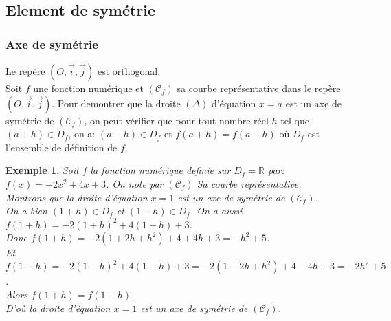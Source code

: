 \documentclass[a4paper, 12pt]{report}
\newtheorem{exemple}{Exemple}[section]
\begin{document}
            \subsection{Element de symétrie}
                \subsubsection{Axe de symétrie} \label{paire}
                Le repère $(O,\vec{i},\vec{j})$ est orthogonal.\\ 
                Soit $f$ une fonction numérique et $(\mathcal{C}_f)$ sa courbe représentative dans le repère $(O,\vec{i},\vec{j})$. 
                Pour demontrer que la droite $(\Delta)$ d'équation $x=a$ est un axe de symétrie de $(\mathcal{C}_f)$, on peut 
                vérifier que pour tout nombre réel $h$ tel que $(a+h)\in D_f$, on a: $(a-h)\in D_f$ et $f(a+h)=f(a-h)$ où 
                $D_f$ est l'ensemble de définition de $f$.
                    \begin{exemple}
                        Soit $f$ la fonction numérique definie sur $D_f=\mathbb{R}$ par:\\ 
                         $f(x)=-2x^2+4x+3$. On note par $(\mathcal{C}_f)$ Sa courbe représentative. \\ 
                        Montrons que la droite d'équation $x=1$ est un axe de symétrie de $(\mathcal{C}_f)$.\\
                        On a bien $(1+h)\in D_f$ et $(1-h)\in D_f$. On a aussi $f(1+h)=-2(1+h)^2+4(1+h)+3$. \\ 
                        Donc $f(1+h)=-2(1+2h+h^2)+4+4h+3=-h^2+5$.\\ 
                        Et $f(1-h)=-2(1-h)^2+4(1-h)+3=-2(1-2h+h^2)+4-4h+3=-2h^2+5$.\\
                        Alors $f(1+h)=f(1-h)$.\\ 
                        D'où la droite d'équation $x=1$ est un axe de symétrie de $(\mathcal{C}_f)$.\\
                    \end{exemple}
\end{document}
